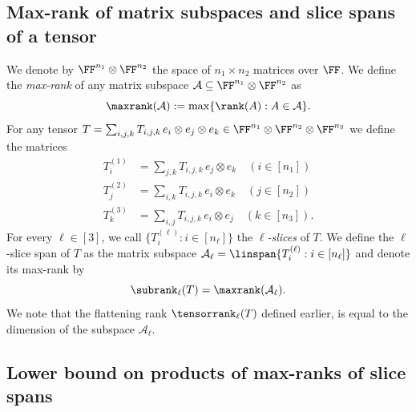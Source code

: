 \subsection{Max-rank of matrix subspaces and slice spans of a tensor}\label{subsec:maxrank}

%
    We denote by $\FF^{n_1} \otimes \FF^{n_2}$ the space of $n_1 \times n_2$ matrices over $\FF$.
    We define the \emph{max-rank} of any matrix subspace $\mathcal{A} \subseteq \FF^{n_1} \otimes \FF^{n_2}$ as
    \[
\maxrank(\mathcal{A}):=\max\{\rank(A):A\in\mathcal{A}\}.
    \]
%
%
For any tensor $T = \sum_{i,j,k} T_{i,j,k}\, e_i \otimes e_j \otimes e_k \in \FF^{n_1} \otimes \FF^{n_2} \otimes \FF^{n_3}$ we define the matrices %
%
%
%
%
%
%
\begin{align*}
T^{(1)}_i &= \sum_{j,k} T_{i,j,k}\, e_j \otimes e_k \quad (i \in [n_1])\\
T^{(2)}_j &= \sum_{i,k} T_{i,j,k}\, e_i \otimes e_k \quad (j \in [n_2])\\
T^{(3)}_k &= \sum_{i,j} T_{i,j,k}\, e_i \otimes e_j \quad (k \in [n_3]).
\end{align*}
For every $\ell \in [3]$, we call $\{T^{(\ell)}_i : i \in [n_\ell] \}$ the \emph{$\ell$-slices} of $T$. %
%
%
%
%
%
%
%
%
%
%
%
%
%
%
%
%
%
%
%
%
%
%
%
%
%
%
%
%
%
%
%
%
%
%
%
%
%
%
%
%
%
%
We define the $\ell$-slice span of $T$ as the matrix subspace
$\mathcal{A}_\ell = \linspan \{T^{(\ell)}_i : i \in [n_\ell] \}$
and denote its max-rank by
\[
\subrank_\ell(T) = \maxrank(\mathcal{A}_\ell).
\]
%
%
We note that the flattening rank $\tensorrank_\ell(T)$ defined earlier, is equal to the dimension of the subspace $\mathcal{A}_\ell$. 

%



%
%



%
%

%
%
%
%
%
%
%
%

%
%
%

%
%
%
%
%
%
%
%
%
%
%
%
%
%
%
%

%

%
%
%
%
%
%
%
%
%
%
%
%
%




\subsection{Lower bound on products of max-ranks of slice spans}\label{subsec:QiQj}

%

